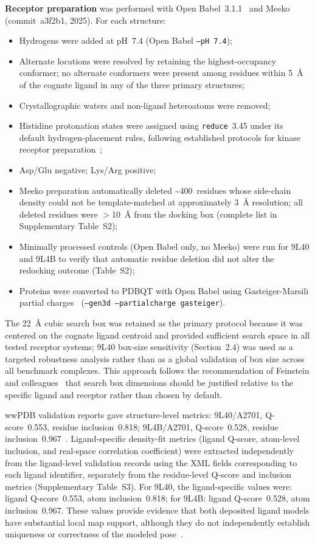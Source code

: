 \documentclass[global,twocolumn]{svjour}
\begin{document}
\textbf{Receptor preparation} was performed with Open Babel~3.1.1~\cite{oboyle2011}
and Meeko (commit~a3f2b1, 2025). For each structure:
\begin{itemize}\sloppy
\item Hydrogens were added at pH~7.4 (Open Babel \texttt{--pH 7.4});
\item Alternate locations were resolved by retaining the highest-occupancy
  conformer; no alternate conformers were present among residues within
  5~\AA{} of the cognate ligand in any of the three primary structures;
\item Crystallographic waters and non-ligand heteroatoms were removed;
\item Histidine protonation states were assigned using \texttt{reduce}~3.45
  under its default hydrogen-placement rules, following established
  protocols for kinase receptor preparation~\cite{olsson2011};
\item Asp/Glu negative; Lys/Arg positive;
\item Meeko preparation automatically deleted \textasciitilde400~residues whose
  side-chain density could not be template-matched at approximately
  3~\AA{} resolution; all deleted residues were $>$10~\AA{} from the
  docking box (complete list in Supplementary Table~S2);
\item Minimally processed controls (Open Babel only, no Meeko) were run
  for 9L40 and 9L4B to verify that automatic residue deletion did not alter
  the redocking outcome (Table~S2);
\item Proteins were converted to PDBQT with Open Babel using Gasteiger-Marsili
  partial charges~\cite{gas_marsili} (\texttt{--gen3d --partialcharge
  gasteiger}).
\end{itemize}

The 22~\AA{} cubic search box was retained as the primary protocol because it
was centered on the cognate ligand centroid and provided sufficient search
space in all tested receptor systems; 9L40 box-size sensitivity (Section~2.4)
was used as a targeted robustness analysis rather than as a global validation
of box size across all benchmark complexes. This approach follows the
recommendation of Feinstein and colleagues~\cite{feinstein2021} that search
box dimensions should be justified relative to the specific ligand and
receptor rather than chosen by default.

wwPDB validation reports gave structure-level metrics: 9L40/A2701,
Q-score~0.553, residue inclusion~0.818; 9L4B/A2701, Q-score~0.528, residue
inclusion~0.967~\cite{pintilie2020}. Ligand-specific density-fit metrics
(ligand Q-score, atom-level inclusion, and real-space correlation coefficient)
were extracted independently from the ligand-level validation records using
the XML fields corresponding to each ligand identifier, separately from the
residue-level Q-score and inclusion metrics (Supplementary Table~S3). For
9L40, the ligand-specific values were: ligand Q-score~0.553, atom
inclusion~0.818; for 9L4B: ligand Q-score~0.528, atom inclusion~0.967. These
values provide evidence that both deposited ligand models have substantial
local map support, although they do not independently establish uniqueness or
correctness of the modeled pose~\cite{pintilie2020}.
\end{document}
